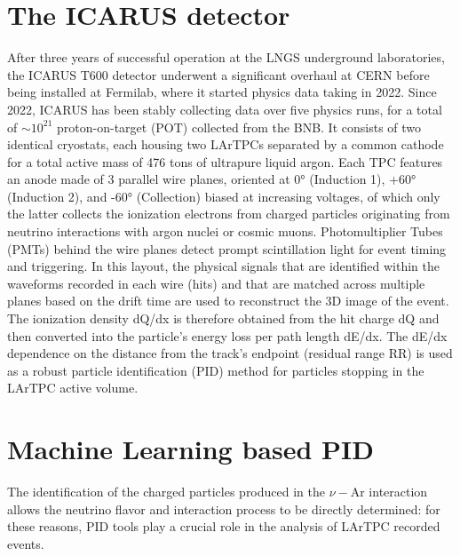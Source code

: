 \documentclass[nocopyright]{cimento}
\begin{document}
\section{The ICARUS detector}



After three years of successful operation at the LNGS underground laboratories, the ICARUS T600 detector \cite{ref:icarus} underwent a significant overhaul at CERN
before being installed at Fermilab, where it started physics data taking in 2022.
Since 2022, ICARUS has been stably collecting data over five physics runs,
for a total of $\sim 10^{21}$ proton-on-target (POT) collected from the BNB.
It consists of two identical cryostats, each housing two LArTPCs separated by a common cathode for a total active mass of 476 tons of ultrapure liquid argon. Each TPC features an anode made of 3 parallel wire planes, oriented at 0° (Induction 1), +60° (Induction 2), and -60° (Collection) biased at increasing voltages, of which only the latter collects the ionization electrons from charged particles originating from neutrino interactions with argon nuclei or cosmic muons. Photomultiplier Tubes (PMTs) behind the wire planes detect prompt scintillation light for event timing and triggering. 
In this layout, the physical signals that are identified within the waveforms recorded in each wire (hits) and that are matched across multiple planes based on the drift time are used to reconstruct the 3D image of the event.
The ionization density dQ/dx is therefore obtained from the
hit charge dQ and then converted into the particle’s energy loss per path length dE/dx. The dE/dx dependence on the distance from the track’s endpoint (residual range RR) is used as a robust particle identification (PID) method for particles stopping in the LArTPC active volume.


\section{Machine Learning based PID}
The identification of the charged particles produced in the $\nu-\text{Ar}$ interaction allows the neutrino flavor and interaction process to be directly determined: for these reasons, PID tools play a crucial role in the analysis of LArTPC recorded events.
\end{document}
